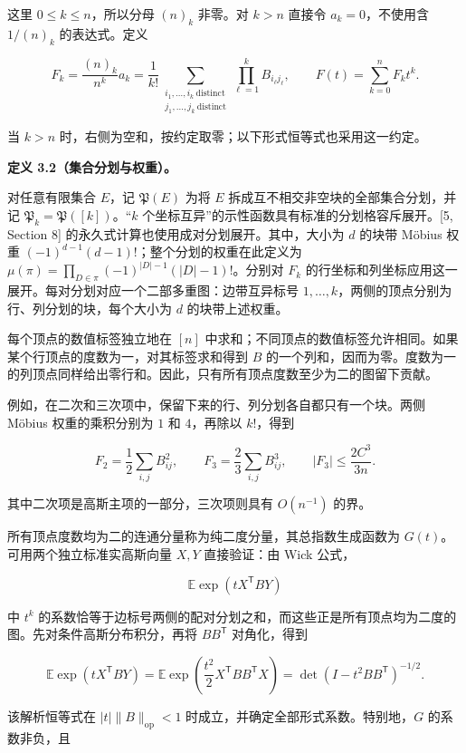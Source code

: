 \documentclass[11pt,a4paper]{article}
\begin{document}
这里 \(0\le k\le n\)，所以分母 \((n)_k\) 非零。对 \(k>n\) 直接令 \(a_k=0\)，不使用含 \(1/(n)_k\) 的表达式。定义

\[F_k=\frac{(n)_k}{n^k}a_k
=\frac1{k!}
\sum_{\substack{i_1,\ldots,i_k\ \mathrm{distinct}\\
j_1,\ldots,j_k\ \mathrm{distinct}}}
\prod_{\ell=1}^kB_{i_\ell j_\ell},
\qquad
F(t)=\sum_{k=0}^nF_kt^k.\]

当 \(k>n\) 时，右侧为空和，按约定取零；以下形式恒等式也采用这一约定。

\textbf{定义 3.2（集合分划与权重）。}

对任意有限集合 \(E\)，记 \(\mathfrak P(E)\) 为将 \(E\) 拆成互不相交非空块的全部集合分划，并记 \(\mathfrak P_k=\mathfrak P([k])\)。``\(k\) 个坐标互异''的示性函数具有标准的分划格容斥展开。{[}5, Section 8{]} 的永久式计算也使用成对分划展开。其中，大小为 \(d\) 的块带 Möbius 权重 \((-1)^{d-1}(d-1)!\)；整个分划的权重在此定义为 \(\mu(\pi)=\prod_{D\in\pi}(-1)^{|D|-1}(|D|-1)!\)。分别对 \(F_k\) 的行坐标和列坐标应用这一展开。每对分划对应一个二部多重图：边带互异标号 \(1,\ldots,k\)，两侧的顶点分别为行、列分划的块，每个大小为 \(d\) 的块带上述权重。

每个顶点的数值标签独立地在 \([n]\) 中求和；不同顶点的数值标签允许相同。如果某个行顶点的度数为一，对其标签求和得到 \(B\) 的一个列和，因而为零。度数为一的列顶点同样给出零行和。因此，只有所有顶点度数至少为二的图留下贡献。

例如，在二次和三次项中，保留下来的行、列分划各自都只有一个块。两侧 Möbius 权重的乘积分别为 \(1\) 和 \(4\)，再除以 \(k!\)，得到

\[F_2=\frac12\sum_{i,j}B_{ij}^2,
\qquad
F_3=\frac23\sum_{i,j}B_{ij}^3,
\qquad |F_3|\le\frac{2C^3}{3n}.\]

其中二次项是高斯主项的一部分，三次项则具有 \(O(n^{-1})\) 的界。

所有顶点度数均为二的连通分量称为纯二度分量，其总指数生成函数为 \(G(t)\)。可用两个独立标准实高斯向量 \(X,Y\) 直接验证：由 Wick 公式，

\[\mathbb E\exp(tX^{\mathsf T}BY)\]

中 \(t^k\) 的系数恰等于边标号两侧的配对分划之和，而这些正是所有顶点均为二度的图。先对条件高斯分布积分，再将 \(BB^{\mathsf T}\) 对角化，得到

\[\mathbb E\exp(tX^{\mathsf T}BY)
=\mathbb E\exp\!\left(\frac{t^2}{2}X^{\mathsf T}BB^{\mathsf T}X\right)
=\det(I-t^2BB^{\mathsf T})^{-1/2}.\]

该解析恒等式在 \(|t|\|B\|_{\mathrm{op}}<1\) 时成立，并确定全部形式系数。特别地，\(G\) 的系数非负，且
\end{document}
